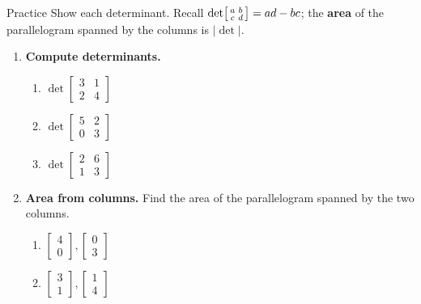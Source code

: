 \documentclass[10pt]{article}
\begin{document}
\namedateperiod

\vspace{0.12in}

\begin{notesbox}{Practice}
Show each determinant. Recall $\det\begin{bsmallmatrix} a & b\\ c & d \end{bsmallmatrix}=ad-bc$;
the \textbf{area} of the parallelogram spanned by the columns is $|\det|$.

\begin{enumerate}[leftmargin=1.9em, itemsep=12pt]
  \item \textbf{Compute determinants.}
    \begin{enumerate}[label=(\alph*), leftmargin=1.8em, itemsep=4pt]
      \item $\det\begin{bmatrix} 3 & 1 \\ 2 & 4 \end{bmatrix}$ \hfill
      \item $\det\begin{bmatrix} 5 & 2 \\ 0 & 3 \end{bmatrix}$ \hfill
      \item $\det\begin{bmatrix} 2 & 6 \\ 1 & 3 \end{bmatrix}$
    \end{enumerate}
    \vspace{1.0cm}
  \item \textbf{Area from columns.} Find the area of the parallelogram spanned by the two columns.
    \begin{enumerate}[label=(\alph*), leftmargin=1.8em, itemsep=4pt]
      \item $\begin{bmatrix} 4 \\ 0 \end{bmatrix}, \begin{bmatrix} 0 \\ 3 \end{bmatrix}$ \hfill
      \item $\begin{bmatrix} 3 \\ 1 \end{bmatrix}, \begin{bmatrix} 1 \\ 4 \end{bmatrix}$

\end{enumerate}
\end{enumerate}
\end{notesbox}
\end{document}
